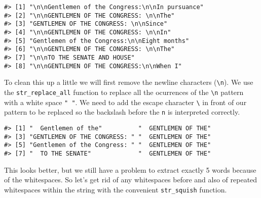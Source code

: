 \documentclass[]{book}
\newenvironment{Shaded}{\begin{snugshade}}{\end{snugshade}}
\newcommand{\CharTok}[1]{\textcolor[rgb]{0.31,0.60,0.02}{#1}}
\newcommand{\CommentTok}[1]{\textcolor[rgb]{0.56,0.35,0.01}{\textit{#1}}}
\newcommand{\DataTypeTok}[1]{\textcolor[rgb]{0.13,0.29,0.53}{#1}}
\newcommand{\DecValTok}[1]{\textcolor[rgb]{0.00,0.00,0.81}{#1}}
\newcommand{\KeywordTok}[1]{\textcolor[rgb]{0.13,0.29,0.53}{\textbf{#1}}}
\newcommand{\NormalTok}[1]{#1}
\newcommand{\OperatorTok}[1]{\textcolor[rgb]{0.81,0.36,0.00}{\textbf{#1}}}
\newcommand{\StringTok}[1]{\textcolor[rgb]{0.31,0.60,0.02}{#1}}
\begin{document}
\begin{verbatim}
#> [1] "\n\nGentlemen of the Congress:\n\nIn pursuance"
#> [2] "\n\nGENTLEMEN OF THE CONGRESS: \n\nThe"        
#> [3] "GENTLEMEN OF THE CONGRESS: \n\nSince"          
#> [4] "\n\nGENTLEMEN OF THE CONGRESS: \n\nIn"         
#> [5] "Gentlemen of the Congress:\n\nEight months"    
#> [6] "\n\nGENTLEMEN OF THE CONGRESS: \n\nThe"        
#> [7] "\n\nTO THE SENATE AND HOUSE"                   
#> [8] "\n\nGENTLEMEN OF THE CONGRESS:\n\nWhen I"
\end{verbatim}

To clean this up a little we will first remove the newline characters (\texttt{\textbackslash{}n}). We use the \texttt{str\_replace\_all} function to replace all the ocurrences of the \texttt{\textbackslash{}n} pattern with a white space \texttt{"\ "}. We need to add the escape character \texttt{\textbackslash{}} in front of our pattern to be replaced so the backslash before the \texttt{n} is interpreted correctly.

\begin{Shaded}
\end{Shaded}

\begin{verbatim}
#> [1] "  Gentlemen of the"          "  GENTLEMEN OF THE"         
#> [3] "GENTLEMEN OF THE CONGRESS: " "  GENTLEMEN OF THE"         
#> [5] "Gentlemen of the Congress: " "  GENTLEMEN OF THE"         
#> [7] "  TO THE SENATE"             "  GENTLEMEN OF THE"
\end{verbatim}

This looks better, but we still have a problem to extract exactly 5 words because of the whitespaces. So let's get rid of any whitespaces before and also of repeated whitespaces within the string with the convenient \texttt{str\_squish} function.
\end{document}
